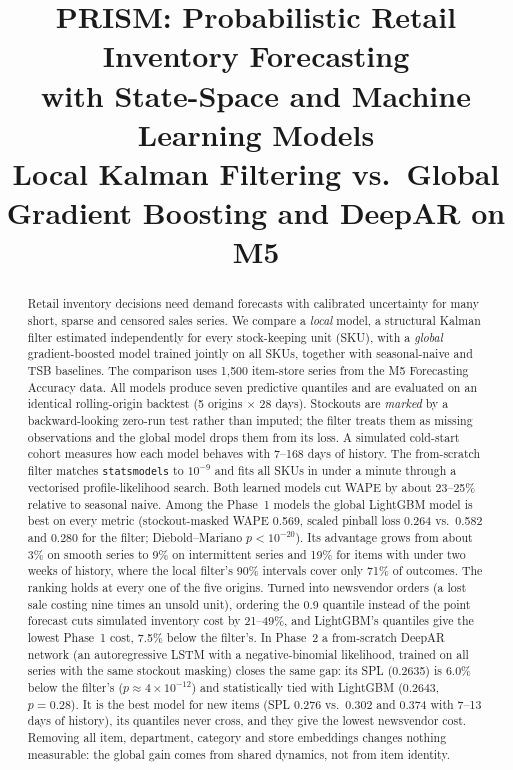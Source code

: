 \documentclass[conference]{IEEEtran}
\begin{document}
\title{PRISM: Probabilistic Retail Inventory Forecasting\\with State-Space and Machine Learning Models\\
{\large Local Kalman Filtering vs.\ Global Gradient Boosting and DeepAR on M5}}

\author{
}

\maketitle

\begin{abstract}
Retail inventory decisions need demand forecasts with calibrated uncertainty for many short, sparse and censored sales series. We compare a \emph{local} model, a structural Kalman filter estimated independently for every stock-keeping unit (SKU), with a \emph{global} gradient-boosted model trained jointly on all SKUs, together with seasonal-naive and TSB baselines. The comparison uses 1{,}500 item-store series from the M5 Forecasting Accuracy data. All models produce seven predictive quantiles and are evaluated on an identical rolling-origin backtest (5 origins $\times$ 28 days). Stockouts are \emph{marked} by a backward-looking zero-run test rather than imputed; the filter treats them as missing observations and the global model drops them from its loss. A simulated cold-start cohort measures how each model behaves with 7--168 days of history. The from-scratch filter matches \texttt{statsmodels} to $10^{-9}$ and fits all SKUs in under a minute through a vectorised profile-likelihood search. Both learned models cut WAPE by about 23--25\% relative to seasonal naive. Among the Phase~1 models the global LightGBM model is best on every metric (stockout-masked WAPE 0.569, scaled pinball loss 0.264 vs.\ 0.582 and 0.280 for the filter; Diebold--Mariano $p<10^{-20}$). Its advantage grows from about 3\% on smooth series to 9\% on intermittent series and 19\% for items with under two weeks of history, where the local filter's 90\% intervals cover only 71\% of outcomes. The ranking holds at every one of the five origins. Turned into newsvendor orders (a lost sale costing nine times an unsold unit), ordering the 0.9 quantile instead of the point forecast cuts simulated inventory cost by 21--49\%, and LightGBM's quantiles give the lowest Phase~1 cost, 7.5\% below the filter's. In Phase~2 a from-scratch DeepAR network (an autoregressive LSTM with a negative-binomial likelihood, trained on all series with the same stockout masking) closes the same gap: its SPL (0.2635) is 6.0\% below the filter's ($p\approx4\times10^{-12}$) and statistically tied with LightGBM (0.2643, $p=0.28$). It is the best model for new items (SPL 0.276 vs.\ 0.302 and 0.374 with 7--13 days of history), its quantiles never cross, and they give the lowest newsvendor cost. Removing all item, department, category and store embeddings changes nothing measurable: the global gain comes from shared dynamics, not from item identity.

\end{abstract}
\end{document}
